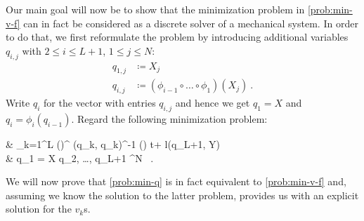 Our main goal will now be to show that the minimization problem in \cref{prob:min-v-f} can in fact be considered as a discrete solver of a mechanical system.
In order to do that, we first reformulate the problem by introducing additional variables $q_{i,j}$ with $2 \leq i \leq L+1$, $1 \leq j \leq N$:
\begin{align}
	q_{1, j} &\coloneqq X_j \, \\
	q_{i, j} &\coloneqq (\phi_{i-1} \circ \ldots \circ \phi_1) (X_j) \ .
\end{align}
Write $q_i$ for the vector with entries $q_{i,j}$ and hence we get $q_1 = X$ and $q_i = \phi_i(q_{i-1})$.
Regard the following minimization problem:
\begin{problem}
	\label{prob:min-q}
	\begin{cases}
		 & \nu \cdot {} \sum_{k=1}^{L} \left(\right)^ \bGamma(q_k, q_k)^{-1} \left(\right) \Delta t+ l(q_{L+1}, Y) \\
		 & q_1 = X  q_2, \ldots, q_{L+1} \in \cX^N \ .
	\end{cases}
\end{problem}
We will now prove that \cref{prob:min-q} is in fact equivalent to \cref{prob:min-v-f} and, assuming we know the solution to the latter problem, provides us with an explicit solution for the $v_k$s.

